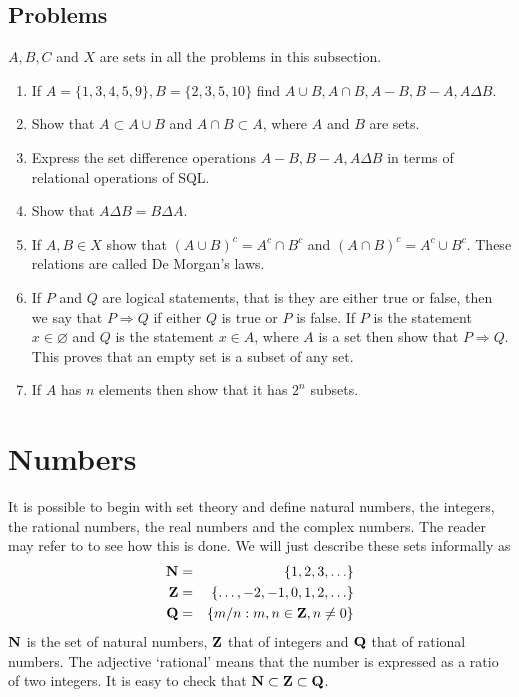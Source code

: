 \subsection{Problems}
$A, B, C$ and $X$ are sets in all the problems in this subsection.
\begin{enumerate}
\item If $A = \{1, 3, 4, 5, 9\}, B = \{2, 3, 5, 10\}$ find $A \cup B, A \cap B,
A - B, B - A, A \Delta B$.
\item Show that $A \subset A \cup B$ and $A \cap B \subset A$, where $A$ and 
$B$ are sets.
\item Express the set difference operations $A - B, B - A, A \Delta B$ in terms 
of relational operations of SQL.
\item Show that $A \Delta B = B \Delta A$.
\item If $A, B \in X$ show that $(A \cup B)^c = A^c \cap B^c$ and $(A \cap B)^c 
= A^c \cup B^c$. These relations are called De Morgan's laws.
\item If $P$ and $Q$ are logical statements, that is they are either true or 
false, then we say that $P \Rightarrow Q$ if either $Q$ is true or $P$ is false.
If $P$ is the statement $x \in \varnothing$ and $Q$ is the statement $x \in A$, 
where $A$ is a set then show that $P \Rightarrow Q$. This proves that an empty 
set is a subset of any set.
\item If $A$ has $n$ elements then show that it has $2^n$ subsets.
\end{enumerate}

\section{Numbers}\label{c1s2}
It is possible to begin with set theory and define natural numbers, the 
integers, the rational numbers, the real numbers and the complex numbers. The 
reader may refer to \cite{tao2009analysis} to see how this is done. We will 
just describe these sets informally as
\begin{eqnarray}
\mathbf{N} &=& \{1, 2, 3, \ldots\} \label{c1s2e1} \\
\mathbf{Z} &=& \{\ldots, -2, -1, 0, 1, 2, \ldots\} \label{c1s2e2} \\
\mathbf{Q} &=& \{m/n : m, n \in \mathbf{Z}, n \ne 0\} \label{c1s2e3} 
\end{eqnarray}
$\mathbf{N}$ is the set of natural numbers, $\mathbf{Z}$ that of integers and $\mathbf{Q}$ that of
rational numbers. The adjective `rational' means that the number is expressed as
a ratio of two integers. It is easy to check that $\mathbf{N} \subset \mathbf{Z} \subset 
\mathbf{Q}$. 

